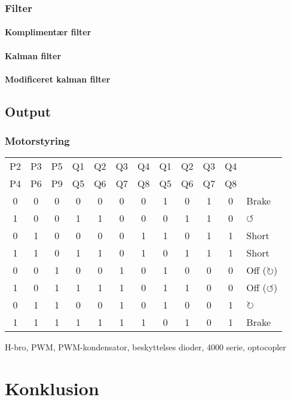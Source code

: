 \documentclass[a4paper,oneside,article,danish,table,draft]{memoir}
\begin{document}
\subsection{Filter}
\subsubsection{Komplimentær filter}
\subsubsection{Kalman filter}
\subsubsection{Modificeret kalman filter}

\section{Output}

\subsection{Motorstyring}
\begin{table}[htbp]
  \centering
  \begin{tabular}{ccc|cccc|ccccl}
      \toprule
     P2&P3&P5 &Q1&Q2&Q3&Q4 &Q1&Q2&Q3&Q4\\
     P4&P6&P9 &Q5&Q6&Q7&Q8 &Q5&Q6&Q7&Q8\\
      \midrule
     0&0&0 &0&0&0&0 &1&0&1&0 & Brake\\
     1&0&0 &1&1&0&0 &0&1&1&0 & $\circlearrowleft$\\
     0&1&0 &0&0&0&1 &1&0&1&1 & Short\\
     1&1&0 &1&1&0&1 &0&1&1&1 & Short\\
     0&0&1 &0&0&1&0 &1&0&0&0 & Off ($\circlearrowright$)\\
     1&0&1 &1&1&1&0 &1&1&0&0 & Off ($\circlearrowleft$)\\
     0&1&1 &0&0&1&0 &1&0&0&1 & $\circlearrowright$\\
     1&1&1 &1&1&1&1 &0&1&0&1 & Brake\\
    \end{tabular}
  \end{table}

H-bro, PWM, PWM-kondensator, beskyttelses dioder, 4000 serie, optocopler



\chapter{Konklusion} \label{chap:kon}
\clearpage
\listoftables
\listoffigures
 
\clearpage \appendix
\end{document}
